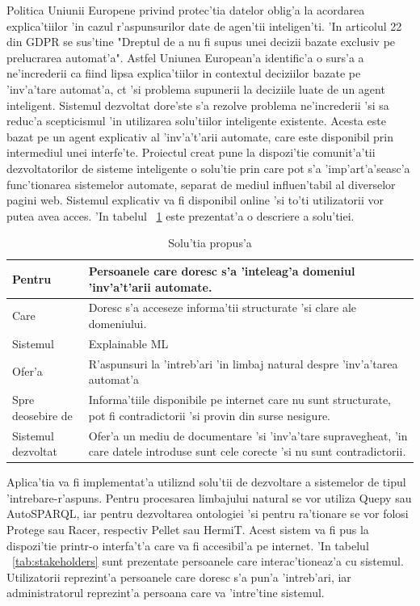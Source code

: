 \documentclass[12pt,a4paper,twoside]{report}
\begin{document}
Politica Uniunii Europene privind protec'tia datelor oblig'a la acordarea explica'tiilor 'in cazul r'aspunsurilor date de agen'tii inteligen'ti. 'In articolul 22 din GDPR se sus'tine "Dreptul de a nu fi supus unei decizii bazate exclusiv pe prelucrarea automat'a". Astfel Uniunea European'a identific'a o surs'a a ne'increderii ca fiind lipsa explica'tiilor in contextul deciziilor bazate pe 'inv'a'tare automat'a, c\ia t 'si problema supunerii la deciziile luate de un agent inteligent. Sistemul dezvoltat dore'ste s'a rezolve problema ne'increderii 'si sa reduc'a scepticismul 'in utilizarea solu'tiilor inteligente existente. Acesta este bazat pe un agent explicativ al 'inv'a't'arii automate, care este disponibil prin intermediul unei interfe'te. Proiectul creat pune la dispozi'tie comunit'a'tii dezvoltatorilor de sisteme inteligente o solu'tie prin care pot s'a 'imp'art'a'seasc'a func'tionarea sistemelor automate, separat de mediul influen'tabil al diverselor pagini web. Sistemul explicativ va fi disponibil online 'si to'ti utilizatorii vor putea avea acces. 'In tabelul ~\ref{tab:solution_table} este prezentat'a o descriere a solu'tiei.


\begin{table}[]
    \centering
    \begin{tabular}{p{3.5cm}|p{8.5cm}}
Pentru &  Persoanele care doresc s'a 'inteleag'a domeniul 'inv'a't'arii automate. \\[1ex]
    \hline
Care & Doresc s'a acceseze informa'tii structurate 'si clare ale domeniului. \\[1ex]
    \hline
Sistemul & Explainable ML\\[1ex]
    \hline
Ofer'a & R'aspunsuri la 'intreb'ari 'in limbaj natural despre 'inv'a'tarea automat'a \\[1ex]
\hline
Spre deosebire de & Informa'tiile disponibile pe internet care nu sunt structurate, pot fi contradictorii 'si provin din surse nesigure.\\[1ex]
\hline
Sistemul dezvoltat & Ofer'a un mediu de documentare 'si 'inv'a'tare supravegheat, 'in care datele introduse sunt cele corecte 'si nu sunt contradictorii. \\[1ex]
    \end{tabular}
     \caption{Solu'tia propus'a}
    \label{tab:solution_table}
\end{table}

Aplica'tia va fi implementat'a utiliz\ia nd solu'tii de dezvoltare a sistemelor de tipul 'intrebare-r'aspuns. Pentru procesarea limbajului natural se vor utiliza Quepy sau AutoSPARQL, iar pentru dezvoltarea ontologiei 'si pentru ra'tionare se vor folosi Protege sau Racer, respectiv Pellet sau HermiT. Acest sistem va fi pus la dispozi'tie printr-o interfa't'a care va fi accesibil'a pe internet. 'In tabelul ~\ref{tab:stakeholders} sunt prezentate persoanele care interac'tioneaz'a cu sistemul. Utilizatorii reprezint'a persoanele care doresc s'a pun'a 'intreb'ari, iar administratorul reprezint'a persoana care va 'intre'tine sistemul.
\end{document}
